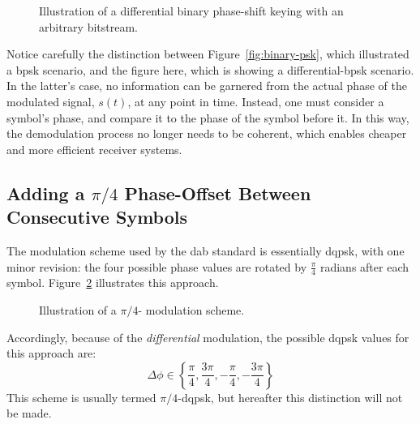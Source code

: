 \documentclass[class=report,11pt,crop=false]{standalone}
\begin{document}
\begin{figure}[htbp]
    \centering
    \captionsetup{type=figure}
    \def\svgwidth{1\linewidth}
    {\scriptsize
        }
    \caption{Illustration of a differential binary phase-shift keying with an arbitrary bitstream.}
    \label{fig:differential-binary-psk}
\end{figure}

Notice carefully the distinction between Figure~\ref{fig:binary-psk}, which illustrated a \gls{bpsk} scenario, and the figure here, which is showing a differential-\gls{bpsk} scenario. In the latter's case, no information can be garnered from the actual phase of the modulated signal, \(s(t)\), at any point in time. Instead, one must consider a symbol's phase, and compare it to the phase of the symbol before it. In this way, the demodulation process no longer needs to be coherent, which enables cheaper and more efficient receiver systems.

\subsection{Adding a $\pi/4$ Phase-Offset Between Consecutive Symbols}
The modulation scheme used by the \gls{dab} standard is essentially \gls{dqpsk}, with one minor revision: the four possible phase values are rotated by \(\frac{\pi}{4}\) radians after each symbol. Figure~\ref{fig:pi-by-4-dqpsk-illustration} illustrates this approach.

\begin{figure}[htbp]
    \centering
    \captionsetup{type=figure}
    \def\svgwidth{1\linewidth}
    { %
    \scriptsize
    }
    \caption{Illustration of a \(\pi/4\)- modulation scheme.}
    \label{fig:pi-by-4-dqpsk-illustration}
\end{figure}

Accordingly, because of the \emph{differential} modulation, the possible \gls{dqpsk} values for this approach are:
\begin{equation}
    \Delta\phi \in \left\{ \frac{\pi}{4}, \frac{3\pi}{4}, -\frac{\pi}{4}, -\frac{3\pi}{4} \right\}
\end{equation}
This scheme is usually termed \(\pi/4\)-\gls{dqpsk}, but hereafter this distinction will not be made.

\end{document}
